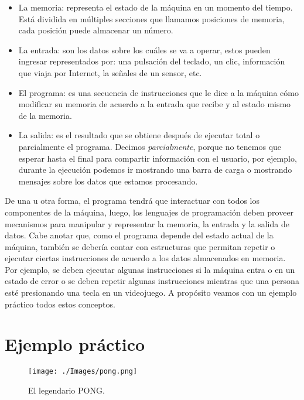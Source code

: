 \begin{itemize}
\item La memoria: representa el estado de la máquina en un momento del tiempo. Está dividida en múltiples secciones que llamamos posiciones de memoria, cada posición puede almacenar un número.

\item La entrada: son los datos sobre los cuáles se va a operar, estos pueden ingresar representados por: una pulsación del teclado, un clic, información que viaja por Internet, la señales de un sensor, etc.
 
\item El programa: es una secuencia de instrucciones que le dice a la máquina cómo modificar su memoria de acuerdo a la entrada que recibe y al estado mismo de la memoria. 

\item La salida: es el resultado que se obtiene después de ejecutar total o parcialmente el programa. Decimos \emph{parcialmente}, porque no tenemos que esperar hasta el final para compartir información con el usuario, por ejemplo, durante la ejecución podemos ir mostrando una barra de carga o mostrando mensajes sobre los datos que estamos procesando.
\end{itemize}



De una u otra forma, el programa tendrá que interactuar con todos los componentes de la máquina, luego, los lenguajes de programación deben proveer mecanismos para manipular y representar la memoria, la entrada y la salida de datos. Cabe anotar que, como el programa depende del estado actual de la máquina, también se debería contar con estructuras que permitan repetir o ejecutar ciertas instrucciones de acuerdo a los datos almacenados en memoria. Por ejemplo, se deben ejecutar algunas instrucciones si la máquina entra o en un estado de error o se deben repetir algunas instrucciones mientras que una persona esté presionando una tecla en un videojuego. A propósito veamos con un ejemplo práctico todos estos conceptos.


\section{Ejemplo práctico}


\begin{figure}[h!]
	\centering
	\texttt{[image: ./Images/pong.png]}
	\caption{El legendario PONG.}
	\label{figpong}
\end{figure}

